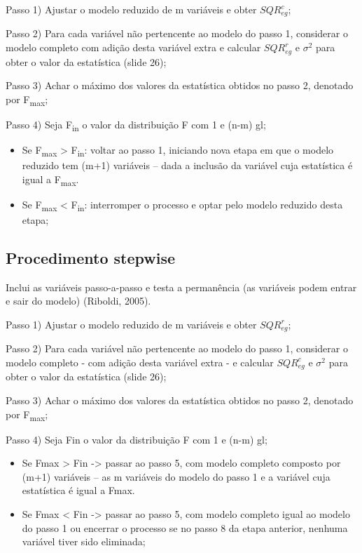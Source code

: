 \documentclass[12pt,brazil,oneside]{book}
\begin{document}
Passo 1) Ajustar o modelo reduzido de m variáveis e obter
\(SQR^{c}_{eg}\);

Passo 2) Para cada variável não pertencente ao modelo do passo 1,
considerar o modelo completo com adição desta variável extra e calcular
\(SQR^{r}_{eg}\) e \(\sigma^{2}\) para obter o valor da estatística
(slide 26);

Passo 3) Achar o máximo dos valores da estatística obtidos no passo 2,
denotado por F\textsubscript{max};

Passo 4) Seja F\textsubscript{in} o valor da distribuição F com 1 e
(n-m) gl;

\begin{itemize}
\item
  Se F\textsubscript{max} \textgreater{} F\textsubscript{in}: voltar ao
  passo 1, iniciando nova etapa em que o modelo reduzido tem (m+1)
  variáveis -- dada a inclusão da variável cuja estatística é igual a
  F\textsubscript{max}.
\item
  Se F\textsubscript{max} \textless{} F\textsubscript{in}: interromper o
  processo e optar pelo modelo reduzido desta etapa;
\end{itemize}

\hypertarget{procedimento-stepwise}{%
\subsection{Procedimento stepwise}\label{procedimento-stepwise}}

Inclui as variáveis passo-a-passo e testa a permanência (as variáveis
podem entrar e sair do modelo) (Riboldi, 2005).

Passo 1) Ajustar o modelo reduzido de m variáveis e obter
\(SQR^{r}_{eg}\);

Passo 2) Para cada variável não pertencente ao modelo do passo 1,
considerar o modelo completo - com adição desta variável extra - e
calcular \(SQR^{c}_{eg}\) e \(\sigma^{2}\) para obter o valor da
estatística (slide 26);

Passo 3) Achar o máximo dos valores da estatística obtidos no passo 2,
denotado por F\textsubscript{max};

Passo 4) Seja Fin o valor da distribuição F com 1 e (n-m) gl;

\begin{itemize}
\item
  Se Fmax \textgreater{} Fin -\textgreater{} passar ao passo 5, com
  modelo completo composto por (m+1) variáveis -- as m variáveis do
  modelo do passo 1 e a variável cuja estatística é igual a Fmax.
\item
  Se Fmax \textless{} Fin -\textgreater{} passar ao passo 5, com modelo
  completo igual ao modelo do passo 1 ou encerrar o processo se no passo
  8 da etapa anterior, nenhuma variável tiver sido eliminada;
\end{itemize}
\end{document}
